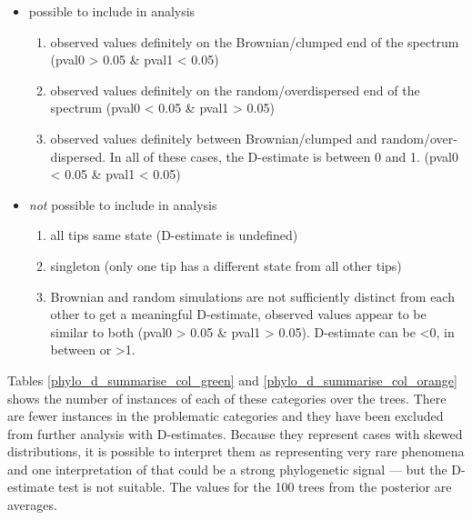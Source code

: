 \documentclass[12pt,letterpaper]{article}
\begin{document}
\begin{itemize}
    \item \colorbox{spec_color_lightgreen!50}{possible to include in analysis}
    \begin{enumerate}[label=(\roman*)]
     \item observed values definitely on the Brownian/clumped end of the spectrum (pval0 > 0.05 \& pval1 < 0.05)
      \item observed values definitely on the random/overdispersed end of the spectrum (pval0 < 0.05 \& pval1 > 0.05)
      \item observed values definitely between Brownian/clumped and random/over-dispersed. In all of these cases, the D-estimate is between 0 and 1. (pval0 < 0.05 \& pval1 < 0.05)
    \end{enumerate}
    \item \colorbox{spec_color_orange!50}{\emph{not} possible to include in analysis}
    \begin{enumerate}[label=(\roman*)]
        \item all tips same state (D-estimate is undefined)
        \item singleton (only one tip has a different state from all other tips)
        \item Brownian and random simulations are not sufficiently distinct from each other to get a meaningful D-estimate, observed values appear to be similar to both (pval0 > 0.05 \& pval1 > 0.05). D-estimate can be <0, in between or >1.
    \end{enumerate}
    
\end{itemize}

Tables \ref{phylo_d_summarise_col_green} and \ref{phylo_d_summarise_col_orange} shows the number of instances of each of these categories over the trees. There are fewer instances in the problematic categories and they have been excluded from further analysis with D-estimates. Because they represent cases with skewed distributions, it is possible to interpret them as representing very rare phenomena and one interpretation of that could be a strong phylogenetic signal --- but the D-estimate test is not suitable. The values for the 100 trees from the posterior are averages.




\end{document}
